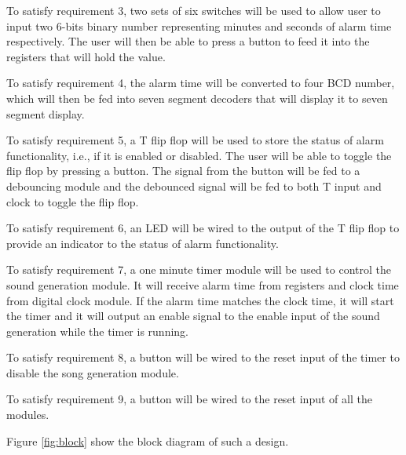 \documentclass[conference]{IEEEtran}
\begin{document}
To satisfy requirement 3, two sets of six switches will be used to allow user to input two 6-bits binary number representing minutes and seconds of alarm time respectively. The user will then be able to press a button to feed it into the registers that will hold the value.

To satisfy requirement 4, the alarm time will be converted to four BCD number, which will then be fed into seven segment decoders that will display it to seven segment display. 

To satisfy requirement 5, a T flip flop will be used to store the status of alarm functionality, i.e., if it is enabled or disabled. The user will be able to toggle the flip flop by pressing a button. The signal from the button will be fed to a debouncing module and the debounced signal will be fed to both T input and clock to toggle the flip flop. 

To satisfy requirement 6, an LED will be wired to the output of the T flip flop to provide an indicator to the status of alarm functionality.

To satisfy requirement 7, a one minute timer module will be used to control the sound generation module. It will receive alarm time from registers and clock time from digital clock module. If the alarm time matches the clock time, it will start the timer and it will output an enable signal to the enable input of the sound generation while the timer is running.

To satisfy requirement 8, a button will be wired to the reset input of the timer to disable the song generation module.

To satisfy requirement 9, a button will be wired to the reset input of all the modules.

Figure \ref{fig:block} show the block diagram of such a design.
\end{document}
